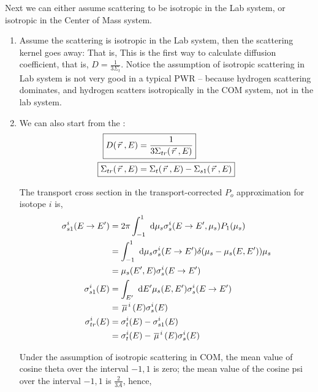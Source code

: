 \documentclass{school-22.211-notes}
\begin{document}
Next we can either assume scattering to be isotropic in the Lab system, or isotropic in the Center of Mass system. 
\begin{enumerate}
\item Assume the scattering is isotropic in the Lab system, then the scattering kernel goes away:
  That is, 
  This is the first way to calculate diffusion coefficient, that is, $D = \frac{1}{3 \Sigma_t}$. Notice the assumption of isotropic scattering in Lab system is not very good in a typical PWR -- because hydrogen scattering dominates, and hydrogen scatters isotropically in the COM system, not in the lab system. 


\item We can also start from the :
  \begin{align}
    \Aboxed{ D(\vecr, E) &= \frac{1}{3 \Sigma_{tr} (\vecr, E) } } \\
    \Aboxed{ \Sigma_{tr} (\vecr, E) &= \Sigma_t(\vecr, E) - \Sigma_{s1} (\vecr, E) } 
  \end{align} 

  The transport cross section in the transport-corrected $P_o$ approximation for isotope $i$ is, 
  \begin{align}
    \sigma_{s1}^i (E\to E') &= 2 \pi \int_{-1}^1 \mbox{ }\mathrm{d} \mu_s \sigma_s^i (E\to E', \mu_s) P_1 (\mu_s) \\
    &= \int_{-1}^1 \mbox{ }\mathrm{d} \mu_s \sigma_s^i (E \to E') \delta(\mu_s - \mu_s(E,E')) \mu_s \\
    &= \mu_s (E', E) \sigma_s^i (E \to E') \\
    \sigma_{s1}^i (E) &= \int_{E'} \mbox{ }\mathrm{d} E' \mu_s(E,E') \sigma_s^i (E\to E') \\
    &= \left.\overline{\mu} \right.^i (E) \sigma_s^i (E) \\
    \sigma_{tr}^i (E) &= \sigma_t^i (E)  - \sigma_{s1}^i (E)  \\
    &= \sigma_t^i (E) - \left.\overline{\mu} \right.^i (E) \sigma_s^i (E)
  \end{align}

  Under the assumption of isotropic scattering in COM, the mean value of cosine theta over the interval $-1,1$ is zero; the mean value of the cosine psi over the interval $-1,1$ is $\frac{2}{3A}$, hence,


\end{enumerate}
\end{document}
